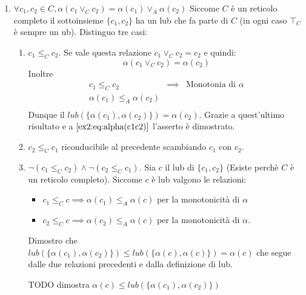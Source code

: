 {\begin{enumerate}
	\item $\boxed{\forall c_1, c_2 \in C, \alpha(c_1 \vee_C c_2) = \alpha(c_1) \vee_A \alpha(c_2)}$
	Siccome $C$ è un reticolo completo il sottoinsieme $\{c_1, c_2\}$ ha un lub che fa parte di $C$ (in ogni caso $\top_C$ è sempre un ub). Distinguo tre casi:
	\begin{enumerate}
		\item $c_1 \leq_C c_2$. Se vale questa relazione $c_1 \vee_C c_2 = c_2$ e quindi:
		\begin{equation}
		\label{ex2:eq:alpha(c1c2)}
		\alpha(c_1 \vee_C c_2) = \alpha(c_2)
		\end{equation}
		Inoltre
		$$
		\begin{array}{lll}
		c_1 \leq_C c_2 & \implies & \text{Monotonia di $\alpha$} \\
		\alpha(c_1) \leq_A \alpha(c_2) & &\\
		\end{array}
		$$
		Dunque il $lub(\{\alpha(c_1), \alpha(c_2)\}) = \alpha(c_2)$.
		Grazie a quest'ultimo risultato e a $\ref{ex2:eq:alpha(c1c2)}$ l'asserto è dimostrato.
		\item $c_2 \leq_C c_1$ riconducibile al precedente scambiando $c_1$ con $c_2$.
		\item $\neg (c_1 \leq_C c_2) \land \neg (c_2 \leq_C c_1)$. Sia $c$ il lub di $\{c_1, c_2\}$
		(Esiste perchè $C$ è un reticolo completo).
		Siccome $c$ è lub valgono le relazioni:
		\begin{itemize}
			\item $c_1 \leq_C c \implies \alpha(c_1) \leq_A \alpha(c)$ per la monotonicità di $\alpha$
			\item $c_2 \leq_C c \implies \alpha(c_2) \leq_A \alpha(c)$ per la monotonicità di $\alpha$.
		\end{itemize}
		Dimostro che $lub(\{\alpha(c_1), \alpha(c_2)\}) \leq lub(\{\alpha(c), \alpha(c)\}) = \alpha(c)$ che segue dalle due relazioni precedenti e dalla definizione di lub.
		
		\huge TODO dimostra $\alpha(c) \leq lub(\{\alpha(c_1), \alpha(c_2)\})$
	\end{enumerate}
	

\end{enumerate}}
